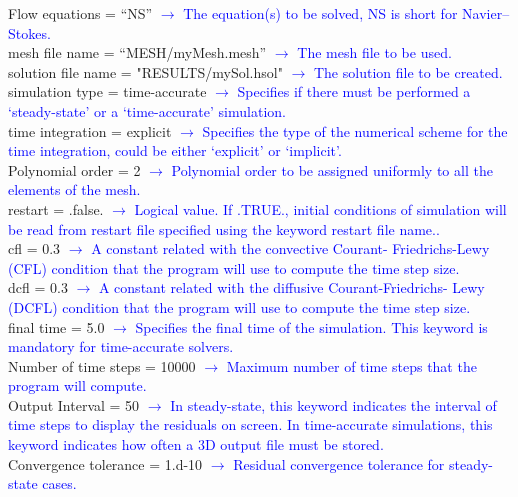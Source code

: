 \documentclass[a4paper,10pt]{report}
\begin{document}
\vspace{0.2 in}
\colorbox{mygray}{
\begin{minipage}{\textwidth}
Flow equations = ``NS''
\textcolor{blue}{$\longrightarrow$ The equation(s) to be solved, NS is short for Navier–Stokes.}\\
mesh file name = ``MESH/myMesh.mesh''
\textcolor{blue}{$\longrightarrow$ The mesh file to be used.}\\
solution file name = "RESULTS/mySol.hsol"
\textcolor{blue}{$\longrightarrow$ The solution file to be created.}\\
simulation type = time-accurate
\textcolor{blue}{$\longrightarrow$ Specifies if there must be performed a `steady-state’ or a `time-accurate’ simulation.}\\
time integration = explicit
\textcolor{blue}{$\longrightarrow$ Specifies the type of the numerical scheme for the time integration, could be either `explicit' or `implicit'.}\\
Polynomial order = 2
\textcolor{blue}{$\longrightarrow$ Polynomial order to be assigned uniformly to all the elements of the mesh.}\\
restart               = .false.
\textcolor{blue}{$\longrightarrow$ Logical value. If .TRUE., initial conditions of simulation will be read from restart file specified using the keyword restart file name..}\\
cfl = 0.3
\textcolor{blue}{$\longrightarrow$ A constant related with the convective Courant- Friedrichs-Lewy (CFL) condition that the program will use to compute the time step size.}\\
dcfl = 0.3
\textcolor{blue}{$\longrightarrow$ A constant related with the diffusive Courant-Friedrichs- Lewy (DCFL) condition that the program will use to compute the
time step size.}\\
final time            = 5.0
\textcolor{blue}{$\longrightarrow$ Specifies the final time of the simulation. This keyword is mandatory for time-accurate solvers.}\\
Number of time steps  = 10000
\textcolor{blue}{$\longrightarrow$ Maximum number of time steps that the program will compute.}\\
Output Interval = 50
\textcolor{blue}{$\longrightarrow$ In steady-state, this keyword indicates the interval of time steps to display the residuals on screen. In time-accurate simulations, this keyword indicates how often a 3D output file must be stored.}\\ 
Convergence tolerance = 1.d-10
\textcolor{blue}{$\longrightarrow$ Residual convergence tolerance for steady-state cases.}\\

\end{minipage}}
\end{document}
